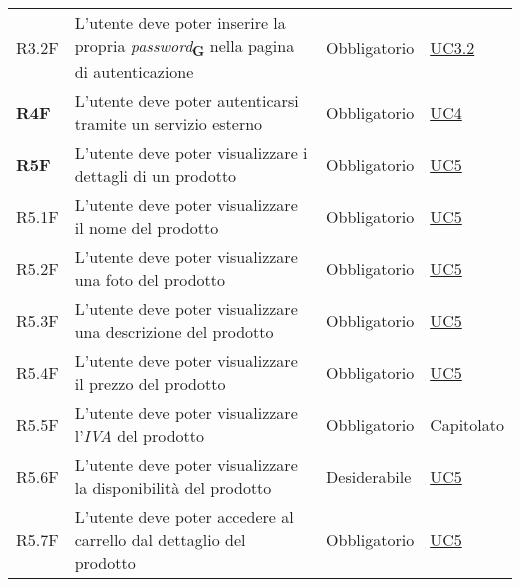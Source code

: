 \begin{center}
\begin{longtable}[!h]{p{50px} p{245px} p{75px} p{50px}}
        R3.2F                                 & L'utente deve poter inserire la propria \textit{password}\textsubscript{\textbf{G}} nella pagina di autenticazione                     & Obbligatorio             & \hyperref[sec:UC3.2]{UC3.2}                  \\
        \textbf{R4F}                          & L'utente deve poter autenticarsi tramite un servizio esterno                                        & Obbligatorio             & \hyperref[sec:UC4]{UC4}                      \\
        \textbf{R5F}                          & L'utente deve poter visualizzare i dettagli di un prodotto                                          & Obbligatorio             & \hyperref[sec:UC5]{UC5}                      \\
        R5.1F                                 & L'utente deve poter visualizzare il nome del prodotto                                               & Obbligatorio             & \hyperref[sec:UC5]{UC5}                      \\
        R5.2F                                 & L'utente deve poter visualizzare una foto del prodotto                                              & Obbligatorio             & \hyperref[sec:UC5]{UC5}                      \\
        R5.3F                                 & L'utente deve poter visualizzare una descrizione del prodotto                                       & Obbligatorio             & \hyperref[sec:UC5]{UC5}                      \\
        R5.4F                                 & L'utente deve poter visualizzare il prezzo del prodotto                                             & Obbligatorio             & \hyperref[sec:UC5]{UC5}                      \\
        R5.5F                                 & L'utente deve poter visualizzare l'\textit{IVA} del prodotto                                        & Obbligatorio             & Capitolato                                   \\
        R5.6F                                 & L'utente deve poter visualizzare la disponibilità del prodotto                                      & Desiderabile             & \hyperref[sec:UC5]{UC5}                      \\
        R5.7F                                 & L'utente deve poter accedere al carrello dal dettaglio del prodotto                               & Obbligatorio             & \hyperref[sec:UC5]{UC5}                      \\

\end{longtable}
\end{center}
